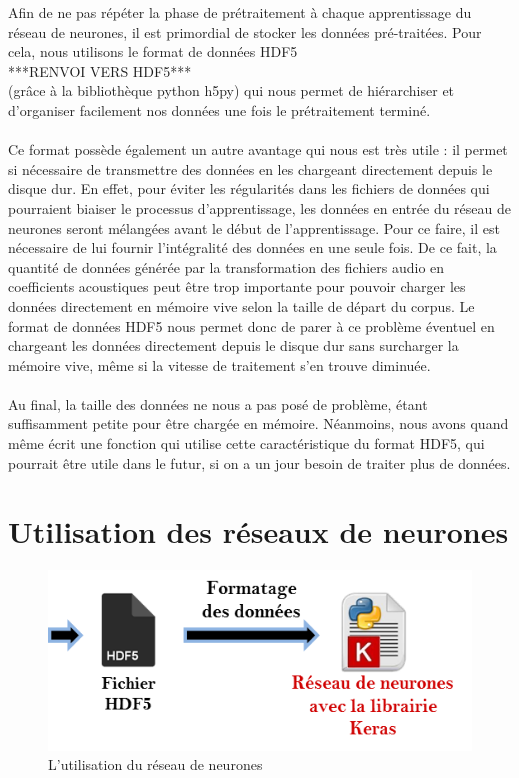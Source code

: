 \documentclass{article}
\begin{document}
Afin de ne pas répéter la phase de prétraitement à chaque apprentissage du réseau de neurones, il est primordial de stocker les données pré-traitées. Pour cela, nous utilisons le format de données HDF5\\ ***RENVOI VERS HDF5***\\ (grâce à la bibliothèque python h5py) qui nous permet de hiérarchiser et d'organiser facilement nos données une fois le prétraitement terminé.\\
 \\
 Ce format possède également un autre avantage qui nous est très utile : il permet si nécessaire de transmettre des données en les chargeant directement depuis le disque dur. En effet, pour éviter les régularités dans les fichiers de données qui pourraient biaiser le processus d'apprentissage, les données en entrée du réseau de neurones seront mélangées avant le début de l'apprentissage. Pour ce faire, il est nécessaire de lui fournir l'intégralité des données en une seule fois. De ce fait, la quantité de données générée par la transformation des fichiers audio en coefficients acoustiques peut être trop importante pour pouvoir charger les données directement en mémoire vive selon la taille de départ du corpus. Le format de données HDF5 nous permet donc de parer à ce problème éventuel en chargeant les données directement depuis le disque dur sans surcharger la mémoire vive, même si la vitesse de traitement s'en trouve diminuée.\\
 \\
Au final, la taille des données ne nous a pas posé de problème, étant suffisamment petite pour être chargée en mémoire. Néanmoins, nous avons quand même écrit une fonction qui utilise cette caractéristique du format HDF5, qui pourrait être utile dans le futur, si on a un jour besoin de traiter plus de données.

\section{Utilisation des réseaux de neurones}

\hphantom{.}
\begin{figure}[h]
  \centerline{\includegraphics[scale=0.9]{img/schema_reseau_keras.png}}
  \caption{L'utilisation du réseau de neurones}
\end{figure}
\end{document}
